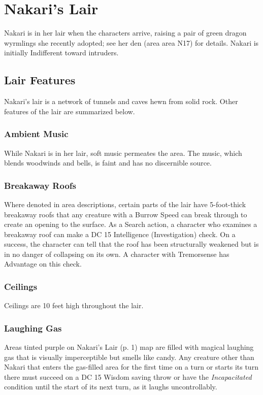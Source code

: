 \documentclass[letterpaper, 11pt, twocolumn]{dndbook}
\begin{document}
\section{Nakari's Lair}

Nakari is in her lair when the characters arrive, raising a pair of green dragon wyrmlings she recently adopted; see her den (area area N17) for details. Nakari is initially Indifferent toward intruders.

\subsection{Lair Features}

Nakari's lair is a network of tunnels and caves hewn from solid rock. Other features of the lair are summarized below.

\subsubsection{Ambient Music}

While Nakari is in her lair, soft music permeates the area. The music, which blends woodwinds and bells, is faint and has no discernible source.

\subsubsection{Breakaway Roofs}

Where denoted in area descriptions, certain parts of the lair have 5-foot-thick breakaway roofs that any creature with a Burrow Speed can break through to create an opening to the surface. As a Search action, a character who examines a breakaway roof can make a DC 15 Intelligence (Investigation) check. On a success, the character can tell that the roof has been structurally weakened but is in no danger of collapsing on its own. A character with Tremorsense has Advantage on this check.

\subsubsection{Ceilings}

Ceilings are 10 feet high throughout the lair.

\subsubsection{Laughing Gas}

Areas tinted purple on Nakari's Lair (p. 1) map are filled with magical laughing gas that is visually imperceptible but smells like candy. Any creature other than Nakari that enters the gas-filled area for the first time on a turn or starts its turn there must succeed on a DC 15 Wisdom saving throw or have the \textit{Incapacitated} condition until the start of its next turn, as it laughs uncontrollably.
\end{document}
